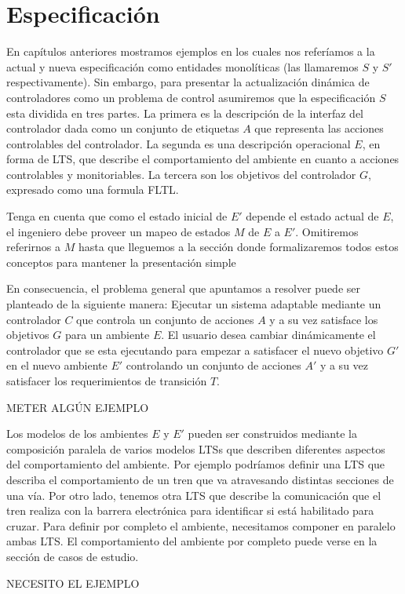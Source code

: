 \section{Especificación}

En capítulos anteriores mostramos ejemplos en los cuales nos referíamos a la actual y nueva especificación como
entidades monolíticas (las llamaremos $S$ y $S'$ respectivamente). Sin embargo, para presentar la actualización dinámica
de controladores como un problema de control asumiremos que la especificación $S$ esta dividida en tres partes. La
primera es la descripción de la interfaz del controlador dada como un conjunto de etiquetas $A$ que representa las
acciones controlables del controlador. La segunda es una descripción operacional $E$, en forma de LTS, que describe el
comportamiento del ambiente en cuanto a acciones controlables y monitoriables. La tercera son los objetivos del
controlador $G$, expresado como una formula FLTL.

Tenga en cuenta que como el estado inicial de $E'$ depende el estado actual de $E$, el ingeniero debe proveer un mapeo de estados
$M$ de $E$ a $E'$. Omitiremos referirnos a $M$ hasta que lleguemos a la sección donde formalizaremos todos estos
conceptos para mantener la presentación simple

En consecuencia, el problema general que apuntamos a resolver puede ser planteado de la siguiente manera: Ejecutar
un sistema adaptable mediante un controlador $C$ que controla un conjunto de acciones $A$ y a su vez satisface los
objetivos $G$ para un ambiente $E$. El usuario desea cambiar dinámicamente el controlador que se esta ejecutando para
empezar a satisfacer el nuevo objetivo $G'$ en el nuevo ambiente $E'$ controlando un conjunto de acciones $A'$ y a su
vez satisfacer los requerimientos de transición $T$.

METER ALGÚN EJEMPLO

Los modelos de los ambientes $E$ y $E'$ pueden ser construidos mediante la composición paralela de varios modelos LTSs
que describen diferentes aspectos del comportamiento del ambiente. Por ejemplo podríamos definir una LTS que describa el
comportamiento de un tren que va atravesando distintas secciones de una vía. Por otro lado, tenemos otra LTS que
describe la comunicación que el tren realiza con la barrera electrónica para identificar si está habilitado para cruzar.
Para definir por completo el ambiente, necesitamos componer en paralelo ambas LTS. El comportamiento del ambiente por
completo puede verse en la sección de casos de estudio.

NECESITO EL EJEMPLO
